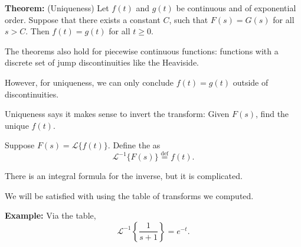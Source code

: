 \documentclass[10pt,aspectratio=169]{beamer}
\begin{document}
\begin{frame}

\textbf{Theorem:} (Uniqueness)
Let $f(t)$ and $g(t)$ be continuous and of exponential order.
Suppose that there exists a constant $C$,
such that $F(s) = G(s)$ for all $s > C$.
Then $f(t) = g(t)$ for all $t \geq 0$.

\medskip
\pause

The theorems also hold for piecewise continuous functions:
functions with a discrete set of jump discontinuities like the
Heaviside.

\medskip

However, for uniqueness, we can only conclude
$f(t) = g(t)$ outside of discontinuities.

\medskip
\pause

Uniqueness says it makes sense to invert the transform:
Given $F(s)$, find the unique $f(t)$.

\medskip
\pause

Suppose $F(s) = \mathcal{L} \bigl\{ f(t) \bigr\}$.
Define the
\emph{} as
\begin{equation*}
{\mathcal{L}}^{-1} \bigl\{ F(s) \bigr\} \overset{\text{def}}{=} f(t) .
\end{equation*}

\pause

There is an integral formula for the inverse, but it is complicated.

We will be satisfied with using the table of transforms we computed.

\medskip
\pause

\textbf{Example:}
Via the table,
\begin{equation*}
{\mathcal{L}}^{-1} \left\{ \frac{1}{s+1} \right\} = 
e^{-t} .
\end{equation*}

\end{frame}
\end{document}
